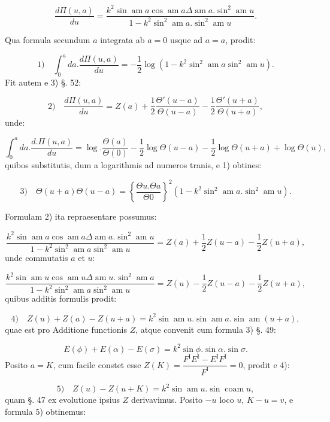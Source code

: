 \documentclass{article}
\begin{document}
\[
\frac{d\Pi(u,a)}{du}=\frac{k^{2}\sin\operatorname{am}a\cos\operatorname{am}a\Delta\operatorname{am}a.\sin^{2}\operatorname{am}u}{1-k^{2}\sin^{2}\operatorname{am}a.\sin^{2}\operatorname{am}u}.
\]

Qua formula secundum $a$ integrata ab $a=0$ usque ad $a=a$, prodit:

\[
\text{1)}\quad \int_{0}^{a}da.\frac{d\Pi(u,a)}{du}=-\frac{1}{2}\log\left(1-k^{2}\sin^{2}\operatorname{am}a\sin^{2}\operatorname{am}u\right).
\]
Fit autem e 3) §. 52:

\[
\text{2)}\quad \frac{d\Pi(u,a)}{du}=Z(a)+\frac{1}{2}\frac{\Theta'(u-a)}{\Theta(u-a)}-\frac{1}{2}\frac{\Theta'(u+a)}{\Theta(u+a)},
\]
unde:

\[
\int_{0}^{a}da.\frac{d.\Pi(u,a)}{du}=\log.\frac{\Theta(a)}{\Theta(0)}-\frac{1}{2}\log\Theta(u-a)-\frac{1}{2}\log\Theta(u+a)+\log\Theta(u),
\]
quibos substitutis, dum a logarithmis ad numeros tranis, e 1) obtines:

\[
\text{3)}\quad \Theta(u+a)\Theta(u-a)=\left\{\frac{\Theta u.\Theta a}{\Theta0}\right\}^{2}\left(1-k^{2}\sin^{2}\operatorname{am}a.\sin^{2}\operatorname{am}u\right).
\]

Formulam 2) ita repraesentare possumus:

\[
\frac{k^{2}\sin\operatorname{am}a\cos\operatorname{am}a\Delta\operatorname{am}a.\sin^{2}\operatorname{am}u}{1-k^{2}\sin^{2}\operatorname{am}a\sin^{2}\operatorname{am}u}=Z(a)+\frac{1}{2}Z(u-a)-\frac{1}{2}Z(u+a),
\]
unde commutatis $a$ et $u$:

\[
\frac{k^{2}\sin\operatorname{am}u\cos\operatorname{am}u\Delta\operatorname{am}u.\sin^{2}\operatorname{am}a}{1-k^{2}\sin^{2}\operatorname{am}a\sin^{2}\operatorname{am}u}=Z(u)-\frac{1}{2}Z(u-a)-\frac{1}{2}Z(u+a),
\]
quibus additis formulis prodit:

\[
\text{4)}\quad Z(u)+Z(a)-Z(u+a)=k^{2}\sin\operatorname{am}u.\sin\operatorname{am}a.\sin\operatorname{am}(u+a),
\]
quae est pro Additione functionis $Z$, atque convenit cum formula 3) §. 49:

\[
E(\phi)+E(\alpha)-E(\sigma)=k^{2}\sin\phi.\sin\alpha.\sin\sigma.
\]
Posito $a=K$, cum facile constet esse $Z(K)=\dfrac{F^{\mathrm{I}}E^{\mathrm{I}}-E^{\mathrm{I}}F^{\mathrm{I}}}{F^{\mathrm{I}}}=0$, prodit e 4):

\[
\text{5)}\quad Z(u)-Z(u+K)=k^{2}\sin\operatorname{am}u.\sin\operatorname{coam}u,
\]
quam §. 47 ex evolutione ipsius $Z$ derivavimus. Posito $-u$ loco $u$, $K-u=v$, e formula 5) obtinemus:
\end{document}

